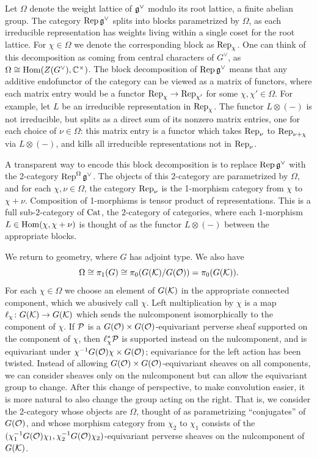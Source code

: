 {Let $\Omega$ denote the weight lattice of $\mathfrak{g}^{\vee}$ modulo its root lattice, a finite abelian group. The category $\operatorname{Rep} \mathfrak{g}^{\vee}$ splits into blocks parametrized by $\Omega$, as each irreducible representation has weights living within a single coset for the root lattice. For $\chi \in \Omega$ we denote the corresponding block as $\operatorname{Rep}_{\chi}$. One can think of this decomposition as coming from central characters of $G^{\vee}$, as $\Omega \cong \operatorname{Hom}(Z(G^{\vee}), \mathbb{C}^\times)$. The block decomposition of $\operatorname{Rep} \mathfrak{g}^{\vee}$ means that any additive endofunctor of the category can be viewed as a matrix of functors, where each matrix entry would be a functor $\operatorname{Rep}_{\chi} \to \operatorname{Rep}_{\chi'}$ for some $\chi, \chi' \in \Omega$. For example, let $L$ be an irreducible representation in $\operatorname{Rep}_{\chi}$. The functor $L \otimes (-)$ is not irreducible, but splits as a direct sum of its nonzero matrix entries, one for each choice of $\nu \in \Omega$: this matrix entry is a functor which takes $\operatorname{Rep}_{\nu}$ to $\operatorname{Rep}_{\nu + \chi}$ via $L \otimes (-)$, and kills all irreducible representations not in $\operatorname{Rep}_{\nu}$.

A transparent way to encode this block decomposition is to replace $\operatorname{Rep} \mathfrak{g}^{\vee}$ with the 2-category $\operatorname{Rep}^\Omega \mathfrak{g}^{\vee}$. The objects of this $2$-category are parametrized by $\Omega$, and for each $\chi, \nu \in \Omega$, the category $\operatorname{Rep}_{\nu}$ is the 1-morphism category from $\chi$ to $\chi+\nu$. Composition of 1-morphisms is tensor product of representations. This is a full sub-$2$-category of $\operatorname{Cat}$, the $2$-category of categories, where each $1$-morphism $L \in \operatorname{Hom}(\chi,\chi+\nu)$ is thought of as the functor $L \otimes (-)$ between the appropriate blocks.

We return to geometry, where $G$ has adjoint type. We also have
\begin{equation} \Omega \cong \pi_1(G) \cong \pi_0(G(\mathcal{K})/G(\mathcal{O})) = \pi_0(G(\mathcal{K})). \end{equation}
For each $\chi \in \Omega$ we choose an element of $G(\mathcal{K})$ in the appropriate connected component, which we abusively call $\chi$. Left multiplication by $\chi$ is a map $\ell_{\chi} \colon G(\mathcal{K}) \to G(\mathcal{K})$ which sends the nulcomponent isomorphically to the component of $\chi$.  If $\mathcal{P}$ is a $G(\mathcal{O}) \times G(\mathcal{O})$-equivariant perverse sheaf supported on the component of $\chi$, then $\ell_\chi^* \mathcal{P}$ is supported instead on the nulcomponent, and is equivariant under $\chi^{-1} G(\mathcal{O}) \chi \times G(\mathcal{O})$; equivariance for the left action has been twisted. 
Instead of allowing $G(\mathcal{O}) \times G(\mathcal{O})$-equivariant sheaves on all components, we can consider sheaves only on the nulcomponent but can allow the equivariant group to change. After this change of perspective, to make convolution easier, it is more natural to also change the group acting on the right. That is, we consider the 2-category whose objects are $\Omega$, thought of as parametrizing ``conjugates'' of $G(\mathcal{O})$, and whose morphism category from $\chi_2$ to $\chi_1$ consists of the $(\chi_1^{-1} G(\mathcal{O}) \chi_1, \chi_2^{-1} G(\mathcal{O}) \chi_2)$-equivariant perverse sheaves on the nulcomponent of $G(\mathcal{K})$.

}

